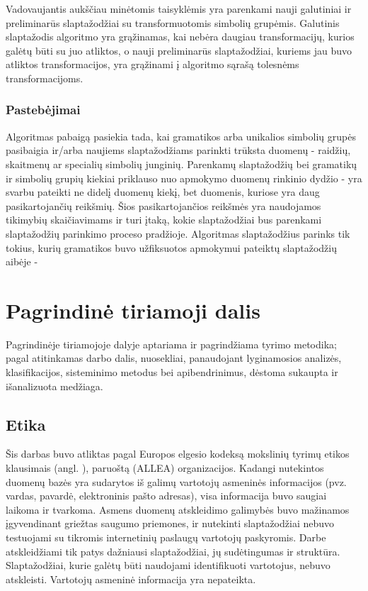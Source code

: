 \documentclass{VUMIFInfBakalaurinis}
\begin{document}
Vadovaujantis aukščiau minėtomis taisyklėmis yra parenkami nauji galutiniai ir 
preliminarūs slaptažodžiai su transformuotomis simbolių grupėmis. Galutinis 
slaptažodis algoritmo yra grąžinamas, kai nebėra daugiau transformacijų, kurios 
galėtų būti su juo atliktos, o nauji preliminarūs slaptažodžiai, kuriems jau 
buvo atliktos transformacijos, yra grąžinami į algoritmo sąrašą tolesnėms 
transformacijoms.

\subsubsection{Pastebėjimai}
Algoritmas pabaigą pasiekia tada, kai gramatikos arba unikalios simbolių grupės 
pasibaigia ir/arba naujiems slaptažodžiams parinkti trūksta duomenų - raidžių, 
skaitmenų ar specialių simbolių junginių. Parenkamų slaptažodžių bei gramatikų 
ir simbolių grupių kiekiai priklauso nuo apmokymo duomenų rinkinio dydžio - yra 
svarbu pateikti ne didelį duomenų kiekį, bet duomenis, kuriose yra daug 
pasikartojančių reikšmių. Šios pasikartojančios reikšmės yra naudojamos 
tikimybių skaičiavimams ir turi įtaką, kokie slaptažodžiai bus parenkami 
slaptažodžių parinkimo proceso pradžioje.
Algoritmas slaptažodžius parinks tik tokius, kurių gramatikos buvo užfiksuotos 
apmokymui pateiktų slaptažodžių aibėje - 



\section{Pagrindinė tiriamoji dalis}
Pagrindinėje tiriamojoje dalyje aptariama ir pagrindžiama tyrimo metodika;
pagal atitinkamas darbo dalis, nuosekliai, panaudojant lyginamosios analizės,
klasifikacijos, sisteminimo metodus bei apibendrinimus, dėstoma sukaupta ir
išanalizuota medžiaga. 

\subsection{Etika}
Šis darbas buvo atliktas pagal Europos elgesio kodeksą mokslinių tyrimų etikos 
klausimais
(angl. ), paruoštą 
 (ALLEA) 
organizacijos. Kadangi nutekintos duomenų bazės yra sudarytos iš galimų 
vartotojų asmeninės informacijos (pvz. vardas, pavardė, elektroninis pašto 
adresas), visa informacija buvo saugiai laikoma ir tvarkoma. Asmens duomenų 
atskleidimo galimybės buvo mažinamos įgyvendinant griežtas saugumo priemones, ir 
nutekinti slaptažodžiai nebuvo testuojami su tikromis internetinių paslaugų 
vartotojų paskyromis. Darbe atskleidžiami tik patys dažniausi slaptažodžiai, jų 
sudėtingumas ir struktūra. Slaptažodžiai, kurie galėtų būti naudojami 
identifikuoti vartotojus, nebuvo atskleisti. Vartotojų asmeninė informacija yra 
nepateikta.
\end{document}
